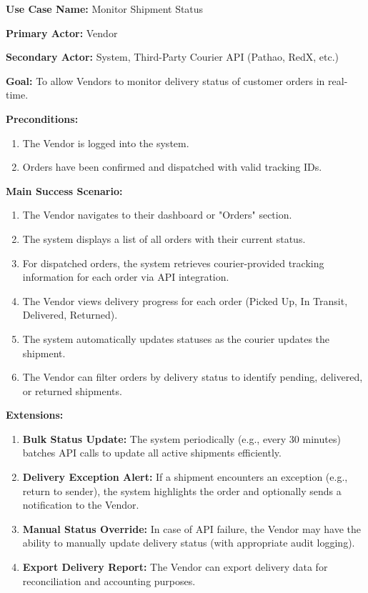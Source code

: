 \textbf{Use Case Name:} Monitor Shipment Status

\textbf{Primary Actor:} Vendor

\textbf{Secondary Actor:} System, Third-Party Courier API (Pathao, RedX, etc.)

\textbf{Goal:} To allow Vendors to monitor delivery status of customer orders in real-time.

\textbf{Preconditions:}
\begin{enumerate}
    \item The Vendor is logged into the system.
    \item Orders have been confirmed and dispatched with valid tracking IDs.
\end{enumerate}

\textbf{Main Success Scenario:}
\begin{enumerate}
    \item The Vendor navigates to their dashboard or "Orders" section.
    \item The system displays a list of all orders with their current status.
    \item For dispatched orders, the system retrieves courier-provided tracking information for each order via API integration.
    \item The Vendor views delivery progress for each order (Picked Up, In Transit, Delivered, Returned).
    \item The system automatically updates statuses as the courier updates the shipment.
    \item The Vendor can filter orders by delivery status to identify pending, delivered, or returned shipments.
\end{enumerate}

\textbf{Extensions:}
\begin{enumerate}
    \item[3a.] \textbf{Bulk Status Update:} The system periodically (e.g., every 30 minutes) batches API calls to update all active shipments efficiently.
    \item[3b.] \textbf{Delivery Exception Alert:} If a shipment encounters an exception (e.g., return to sender), the system highlights the order and optionally sends a notification to the Vendor.
    \item[4a.] \textbf{Manual Status Override:} In case of API failure, the Vendor may have the ability to manually update delivery status (with appropriate audit logging).
    \item[5a.] \textbf{Export Delivery Report:} The Vendor can export delivery data for reconciliation and accounting purposes.
\end{enumerate}

